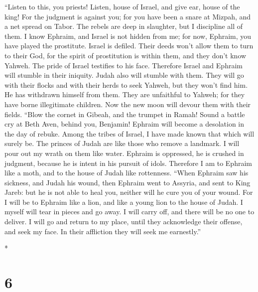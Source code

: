 \begin{paracol}{2}
\begin{otherlanguage}{english}
 ``Listen to this, you priests! Listen, house of Israel,
and give ear, house of the king! For the judgment is against you; for
you have been a snare at Mizpah, and a net spread on Tabor.
 The rebels are deep in slaughter, but I discipline all of
them.  I know Ephraim, and Israel is not hidden from me;
for now, Ephraim, you have played the prostitute. Israel is defiled.
 Their deeds won't allow them to turn to their God, for
the spirit of prostitution is within them, and they don't know Yahweh.
 The pride of Israel testifies to his face. Therefore
Israel and Ephraim will stumble in their iniquity. Judah also will
stumble with them.  They will go with their flocks and
with their herds to seek Yahweh, but they won't find him. He has
withdrawn himself from them.  They are unfaithful to
Yahweh; for they have borne illegitimate children. Now the new moon will
devour them with their fields.  ``Blow the cornet in
Gibeah, and the trumpet in Ramah! Sound a battle cry at Beth Aven,
behind you, Benjamin!  Ephraim will become a desolation in
the day of rebuke. Among the tribes of Israel, I have made known that
which will surely be.  The princes of Judah are like
those who remove a landmark. I will pour out my wrath on them like
water.  Ephraim is oppressed, he is crushed in judgment,
because he is intent in his pursuit of idols.  Therefore
I am to Ephraim like a moth, and to the house of Judah like rottenness.
 ``When Ephraim saw his sickness, and Judah his wound,
then Ephraim went to Assyria, and sent to King Jareb: but he is not able
to heal you, neither will he cure you of your wound.  For
I will be to Ephraim like a lion, and like a young lion to the house of
Judah. I myself will tear in pieces and go away. I will carry off, and
there will be no one to deliver.  I will go and return to
my place, until they acknowledge their offense, and seek my face. In
their affliction they will seek me earnestly.''

\end{otherlanguage}

\switchcolumn[0]*

\hypertarget{section-10}{%
\section{6}\label{section-10}}


\end{paracol}
